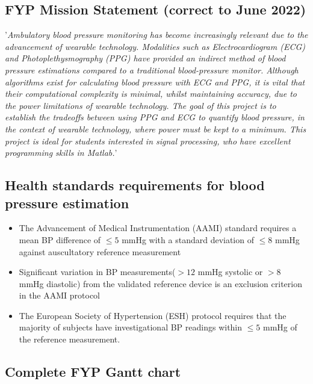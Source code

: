 \subsection{FYP Mission Statement (correct to June 2022)}
'\emph{Ambulatory blood pressure monitoring has become increasingly 
relevant due to the advancement of wearable technology. 
Modalities such as Electrocardiogram (ECG) and Photoplethysmography 
(PPG) have provided an indirect method of blood pressure estimations 
compared to a traditional blood-pressure monitor. Although algorithms 
exist for calculating blood pressure with ECG and PPG, it is vital 
that their computational complexity is minimal, whilst maintaining 
accuracy, due to the power limitations of wearable technology. The 
goal of this project is to establish the tradeoffs between using 
PPG and ECG to quantify blood pressure, in the context of wearable
 technology, where power must be kept to a minimum. This project is
  ideal for students interested in signal processing, who have 
  excellent programming skills in Matlab.}'


\subsection{Health standards requirements for blood pressure estimation}
\begin{itemize}
    \item The Advancement of Medical Instrumentation (AAMI) standard requires a mean BP difference of $\le 5$ mmHg with a standard deviation of $\le 8$ mmHg against auscultatory reference measurement
    \item Significant variation in BP measurements($> 12$ mmHg systolic or $> 8$ mmHg diastolic) from the validated reference device is an exclusion criterion in the AAMI protocol \cite{Bard2019}
    \item The European Society of Hypertension (ESH) protocol requires that the majority of subjects have investigational BP readings within $\le 5$ mmHg of the reference measurement.
\end{itemize}

\subsection{Complete FYP Gantt chart}